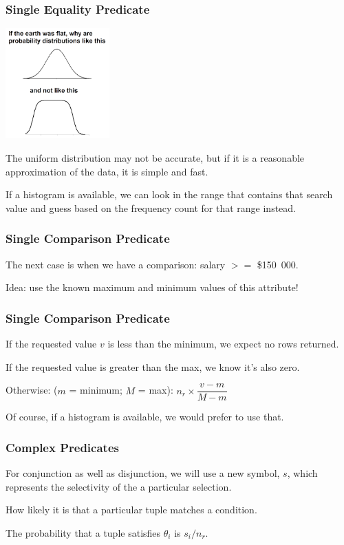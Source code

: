 \begin{frame}
\frametitle{Single Equality Predicate}

\begin{center}
	\includegraphics[width=0.3\textwidth]{images/distribution.png}
\end{center}


The uniform distribution may not be accurate, but if it is a reasonable approximation of the data, it is simple and fast. 

If a histogram is available, we can look in the range that contains that search value and guess based on the frequency count for that range instead.

\end{frame}


\begin{frame}
\frametitle{Single Comparison Predicate}

The next case is when we have a comparison: salary $>=$ \$150~000. 

Idea: use the known maximum and minimum values of this attribute!

\end{frame}


\begin{frame}
\frametitle{Single Comparison Predicate}

If the requested value $v$ is less than the minimum, we expect no rows returned. 

If the requested value is greater than the max, we know it's also zero.

Otherwise: ($m$ = minimum; $M$ = max): $n_{r} \times \dfrac{v - m}{M - m}$

Of course, if a histogram is available, we would prefer to use that. 

\end{frame}

\begin{frame}
\frametitle{Complex Predicates}

For conjunction as well as disjunction, we will use a new symbol, $s$, which represents the selectivity of the a particular selection. 

How likely it is that a particular tuple matches a condition. 

The probability that a tuple satisfies $\theta_{i}$ is $s_{i}/n_{r}$.


\end{frame}

